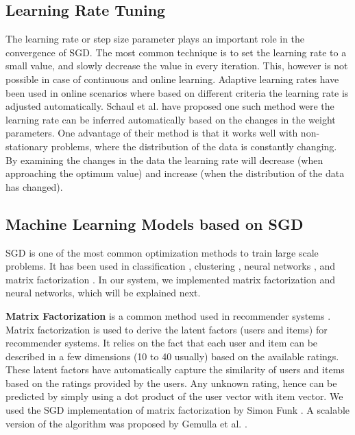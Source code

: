 \documentclass{sig-alternate-05-2015}
\begin{document}
\subsection{Learning Rate Tuning} \label{learning-rate}
The learning rate or step size parameter plays an important role in the convergence of SGD.
The most common technique is to set the learning rate to a small value, and slowly decrease the value in every iteration. 
This, however is not possible in case of continuous and online learning. 
Adaptive learning rates have been used in online scenarios where based on different criteria the learning rate is adjusted automatically.
Schaul et al. \cite{schaul2013no} have proposed one such method were the learning rate can be inferred automatically based on the changes in the weight parameters. 
One advantage of their method is that it works well with non-stationary problems, where the distribution of the data is constantly changing. 
By examining the changes in the data the learning rate will decrease (when approaching the optimum value) and increase (when the distribution of the data has changed).

\subsection{Machine Learning Models based on SGD}
SGD is one of the most common optimization methods to train large scale problems. 
It has been used in classification \cite{zhang2004solving}, clustering \cite{bottou1995convergence}, neural networks \cite{dean2012large}, and matrix factorization \cite{funk2006netflix}.
In our system, we implemented matrix factorization and neural networks, which will be explained next. 

\textbf{Matrix Factorization} is a common method used in recommender systems \cite{koren2009matrix}. 
Matrix factorization is used to derive the latent factors (users and items) for recommender systems.
It relies on the fact that each user and item can be described in a few dimensions (10 to 40 usually) based on the available ratings.
These latent factors have automatically capture the similarity of users and items based on the ratings provided by the users.
Any unknown rating, hence can be predicted by simply using a dot product of the user vector with item vector.
We used the SGD implementation of matrix factorization by Simon Funk \cite{funk2006netflix}. 
A scalable version of the algorithm was proposed by Gemulla et al. \cite{gemulla2011large}.
\end{document}
